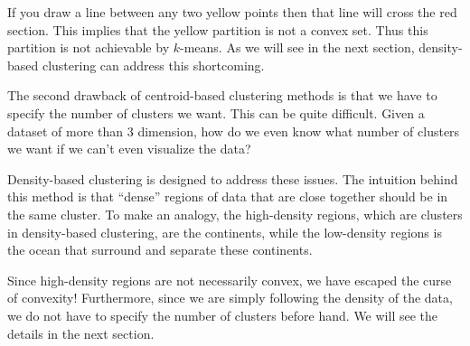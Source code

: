 If you draw a line between any two yellow points then that line will
cross the red section. This implies that the yellow partition is not a convex
set. Thus this partition is not achievable by $k$-means. As we will see
in the next section, density-based clustering can address this shortcoming.

The second drawback of centroid-based clustering methods is that we have
to specify the number of clusters we want. This can be quite difficult. Given
a dataset of more than 3 dimension, how do we even know what number of clusters
we want if we can't even visualize the data?

Density-based clustering is designed to address these issues.
The intuition behind this method is that ``dense'' regions of data
that are close together should be in the same cluster. To make an analogy,
the high-density regions, which are clusters in density-based clustering, are the continents,
while the low-density regions is the ocean that surround and separate these
continents.

Since high-density regions are not necessarily convex, we have escaped the curse of
convexity! Furthermore, since we are simply following the density of the data,
we do not have to specify the number of clusters before hand. We will see the
details in the next section.
